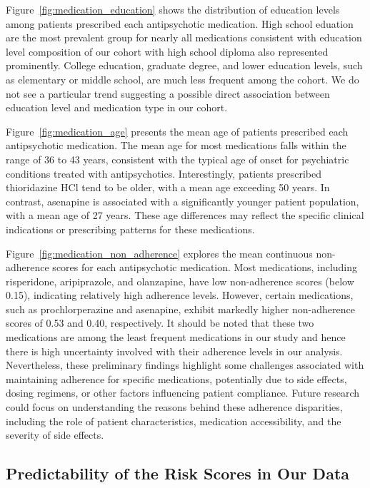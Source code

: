 Figure~\ref{fig:medication_education} shows the distribution of education levels among patients prescribed each antipsychotic medication. 
High school eduation are the most prevalent group for nearly all medications consistent with education level composition of our cohort with high school diploma also represented prominently. 
College education, graduate degree, and lower education levels, such as elementary or middle school, are much less frequent among the cohort. 
We do not see a particular trend suggesting a possible direct association between education level and medication type in our cohort.

Figure~\ref{fig:medication_age} presents the mean age of patients prescribed each antipsychotic medication. 
The mean age for most medications falls within the range of 36 to 43 years, consistent with the typical age of onset for psychiatric conditions treated with antipsychotics. 
Interestingly, patients prescribed thioridazine HCl tend to be older, with a mean age exceeding 50 years. 
In contrast, asenapine is associated with a significantly younger patient population, with a mean age of 27 years. 
These age differences may reflect the specific clinical indications or prescribing patterns for these medications.

Figure~\ref{fig:medication_non_adherence} explores the mean continuous non-adherence scores for each antipsychotic medication. 
Most medications, including risperidone, aripiprazole, and olanzapine, have low non-adherence scores (below 0.15), indicating relatively high adherence levels. 
However, certain medications, such as prochlorperazine and asenapine, exhibit markedly higher non-adherence scores of 0.53 and 0.40, respectively. 
It should be noted that these two medications are among the least frequent medications in our study and hence there is high uncertainty involved with their adherence levels in our analysis. 
Nevertheless, these preliminary findings highlight some challenges associated with maintaining adherence for specific medications, potentially due to side effects, dosing regimens, or other factors influencing patient compliance. 
Future research could focus on understanding the reasons behind these adherence disparities, including the role of patient characteristics, medication accessibility, and the severity of side effects. 

\vspace{-0.75em}
\subsection{Predictability of the Risk Scores in Our Data}
\label{apd:risk_score_evaluations}
\vspace{-0.25em}

